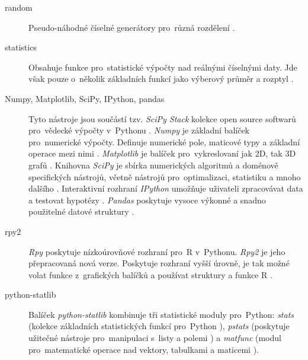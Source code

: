 \documentclass[thesis=B,czech]{FITthesis}[2012/06/26]
\begin{document}
\begin{description}

\item[random] Pseudo-náhodné číselné generátory pro~různá rozdělení \cite{random}.

\item[statistics] \begin{sloppypar}Obsahuje funkce pro~statistické výpočty nad reálnými číselnými daty. Jde však pouze o~několik základních funkcí jako výberový průměr a rozptyl \cite{statistics}.\end{sloppypar}

\item[Numpy, Matplotlib, SciPy, IPython, pandas] \begin{sloppypar}Tyto nástroje jsou součástí tzv. \textit{SciPy Stack} kolekce open source softwarů pro~vědecké výpočty v~Pythonu \cite{SciPy}. \textit{Numpy} je základní balíček pro~numerické výpočty. Definuje numerické pole, maticové typy a základní operace mezi nimi \cite{NumPy}. \textit{Matplotlib} je balíček pro~vykreslovaní jak 2D, tak 3D grafů \cite{matplotlib}. Knihovna \textit{SciPy} je sbírka numerických algoritmů a doménově specifických nástrojů, včetně nástrojů pro~optimalizaci, statistiku a mnoho dalšího \cite{SciPy}. Interaktivní rozhraní \textit{IPython} umožňuje uživateli zpracovávat data a testovat hypotézy \cite{IPython}.  \textit{Pandas} poskytuje vysoce výkonné a snadno použitelné datové struktury \cite{pandas}. \end{sloppypar}

\item[rpy2] \begin{sloppypar} \textit{Rpy} poskytuje nízkoúrovňové rozhraní pro~R v~Pythonu. \textit{Rpy2} je jeho přepracovaná nová verze. Poskytuje rozhraní vyšší úrovně, je tak možné volat funkce z~grafických balíčků a používat struktury a funkce R \cite{rpy2}. \end{sloppypar}

\item[python-statlib] \begin{sloppypar} Balíček \textit{python-statlib} \cite{statlib} kombinuje tři statistické moduly pro~Python: \textit{stats} (kolekce základních statistických funkcí pro~Python \cite{StatsDoc}), \textit{pstats} (poskytuje užitečné nástroje pro~manipulaci s~listy a polemi \cite{PstatDoc}) a \textit{matfunc} (modul pro~matematické operace nad vektory, tabulkami a maticemi \cite{Matfunc}).\end{sloppypar}


\end{description}
\end{document}
